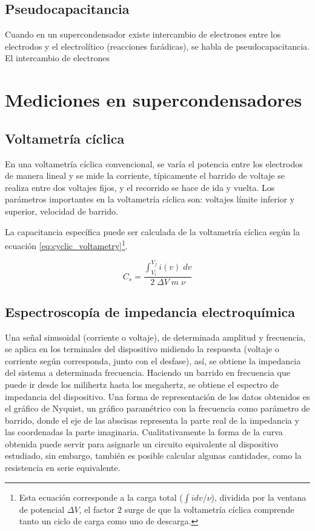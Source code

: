 \subsection{Pseudocapacitancia}
Cuando en un supercondensador existe intercambio de electrones entre los electrodos y el electrolítico (reacciones farádicas), se habla de pseudocapacitancia. El intercambio de electrones 


\section{Mediciones en supercondensadores}

\subsection{Voltametría cíclica}
En una voltametría cíclica convencional, se varía el potencia entre los electrodos de manera lineal y se mide la corriente, típicamente el barrido de voltaje se realiza entre dos voltajes fijos, y el recorrido se hace de ida y vuelta. Los parámetros importantes en la voltametría cíclica son: voltajes límite inferior y superior, velocidad de barrido.

La capacitancia específica puede ser calculada de la voltametría cíclica según la ecuación \ref{eq:cyclic_voltametry}\footnote{Esta ecuación corresponde a la carga total ($\int i dv / \nu$), dividida por la ventana de potencial $\Delta V$, el factor $2$ surge de que la voltametría cíclica comprende tanto un ciclo de carga como uno de descarga.}.

\begin{equation}\label{eq:cyclic_voltametry}
	C_{s} = \frac{\int_{V_i}^{V_f}i(v) \; dv}{2 \; \Delta V \; m \; \nu }
\end{equation}

\subsection{Espectroscopía de impedancia electroquímica}
Una señal sinusoidal (corriente o voltaje), de determinada amplitud y frecuencia, se aplica en los terminales del dispositivo midiendo la respuesta (voltaje o corriente según corresponda, junto con el desfase), así, se obtiene la impedancia del sistema a determinada frecuencia. Haciendo un barrido en frecuencia que puede ir desde los milihertz hasta los megahertz, se obtiene el espectro de impedancia del dispositivo. Una forma de representación de los datos obtenidos es el gráfico de Nyquist, un gráfico paramétrico con la frecuencia como parámetro de barrido, donde el eje de las abscisas representa la parte real de la impedancia y las coordenadas la parte imaginaria. Cualitativamente la forma de la curva obtenida puede servir para asignarle un circuito equivalente al dispositivo estudiado, sin embargo, también es posible calcular algunas cantidades, como la resistencia en serie equivalente.


